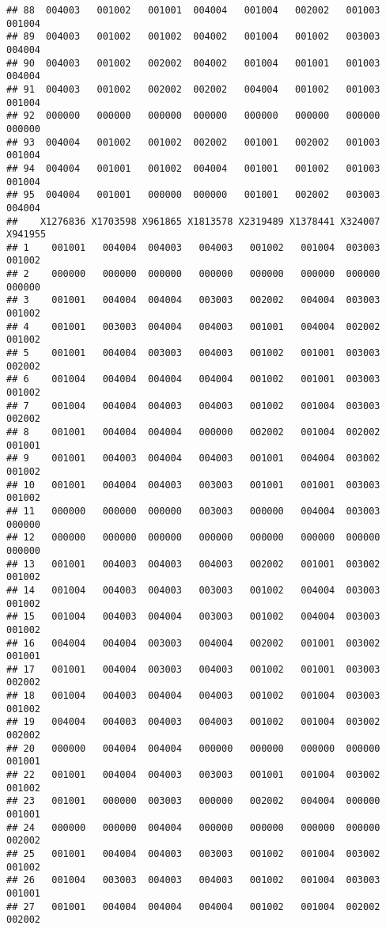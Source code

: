 \documentclass[
]{article}
\begin{document}
\begin{verbatim}
## 88  004003   001002   001001  004004   001004   002002   001003   001004
## 89  004003   001002   001002  004002   001004   001002   003003   004004
## 90  004003   001002   002002  004002   001004   001001   001003   004004
## 91  004003   001002   002002  002002   004004   001002   001003   001004
## 92  000000   000000   000000  000000   000000   000000   000000   000000
## 93  004004   001002   001002  002002   001001   002002   001003   001004
## 94  004004   001001   001002  004004   001001   001002   001003   001004
## 95  004004   001001   000000  000000   001001   002002   003003   004004
##    X1276836 X1703598 X961865 X1813578 X2319489 X1378441 X324007 X941955
## 1    001001   004004  004003   004003   001002   001004  003003  001002
## 2    000000   000000  000000   000000   000000   000000  000000  000000
## 3    001001   004004  004004   003003   002002   004004  003003  001002
## 4    001001   003003  004004   004003   001001   004004  002002  001002
## 5    001001   004004  003003   004003   001002   001001  003003  002002
## 6    001004   004004  004004   004004   001002   001001  003003  001002
## 7    001004   004004  004003   004003   001002   001004  003003  002002
## 8    001001   004004  004004   000000   002002   001004  002002  001001
## 9    001001   004003  004004   004003   001001   004004  003002  001002
## 10   001001   004004  004003   003003   001001   001001  003003  001002
## 11   000000   000000  000000   003003   000000   004004  003003  000000
## 12   000000   000000  000000   000000   000000   000000  000000  000000
## 13   001001   004003  004003   004003   002002   001001  003002  001002
## 14   001004   004003  004003   003003   001002   004004  003003  001002
## 15   001004   004003  004004   003003   001002   004004  003003  001002
## 16   004004   004004  003003   004004   002002   001001  003002  001001
## 17   001001   004004  003003   004003   001002   001001  003003  002002
## 18   001004   004003  004004   004003   001002   001004  003003  001002
## 19   004004   004003  004003   004003   001002   001004  003002  002002
## 20   000000   004004  004004   000000   000000   000000  000000  001001
## 22   001001   004004  004003   003003   001001   001004  003002  001002
## 23   001001   000000  003003   000000   002002   004004  000000  001001
## 24   000000   000000  004004   000000   000000   000000  000000  002002
## 25   001001   004004  004003   003003   001002   001004  003002  001002
## 26   001004   003003  004003   004003   001002   001004  003003  001001
## 27   001001   004004  004004   004004   001002   001004  002002  002002

\end{verbatim}
\end{document}
